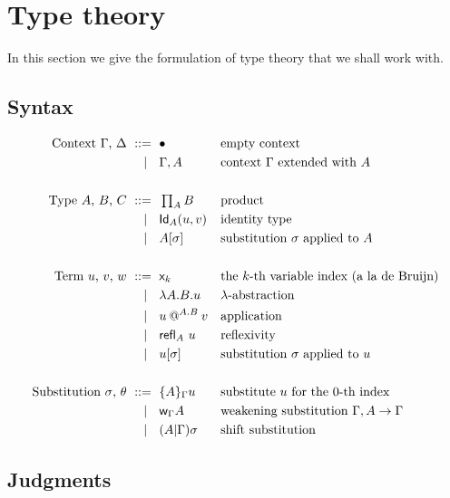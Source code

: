 \section{Type theory}
\label{sec:type-theory}

In this section we give the formulation of type theory that we shall work with.

\subsection{Syntax}
\label{sec:syntax}

\begin{align*}
  \text{Context $\Gamma$, $\Delta$}
    \ \mathrel{{:}{:}{=}}\    {}& \bullet                && \text{empty context} \\
    \ \mid\ \  {}& \Gamma, A       && \text{context $\Gamma$ extended with $A$} \\
  \\
  \text{Type $A$, $B$, $C$}
    \ \mathrel{{:}{:}{=}}\    {}& \mathop{\textstyle\prod_{A}} B             && \text{product}\\
    \ \mid\ \  {}& \mathsf{Id}_{A}(u,v)        && \text{identity type} \\
    \ \mid\ \  {}& A[\sigma]         && \text{substitution $\sigma$ applied to $A$} \\
  \\
  \text{Term $u$, $v$, $w$}
    \ \mathrel{{:}{:}{=}}\    {}& \mathsf{x}_{k}                  && \text{the $k$-th variable index (a la de Bruijn)} \\
    \ \mid\ \  {}& \lambda A . B . u         && \text{$\lambda$-abstraction} \\
    \ \mid\ \  {}& u\mathbin{@^{A.B}} v   && \text{application} \\
    \ \mid\ \  {}& {\mathsf{refl}_{A}}\  u            && \text{reflexivity} \\
    \ \mid\ \  {}& u[\sigma]        && \text{substitution $\sigma$ applied to $u$} \\
  \\
  \text{Substitution $\sigma$, $\theta$}
    \ \mathrel{{:}{:}{=}}\    {}& \{A\}_{\Gamma}{u}     && \text{substitute $u$ for the $0$-th index} \\
    \ \mid\ \  {}& \mathsf{w}_{\Gamma}{A}          && \text{weakening substitution $\Gamma, A \to \Gamma$} \\
    \ \mid\ \  {}& (A {\mid} \Gamma){\sigma}   && \text{shift substitution}
\end{align*}

\subsection{Judgments}
\label{sec:judgments}

